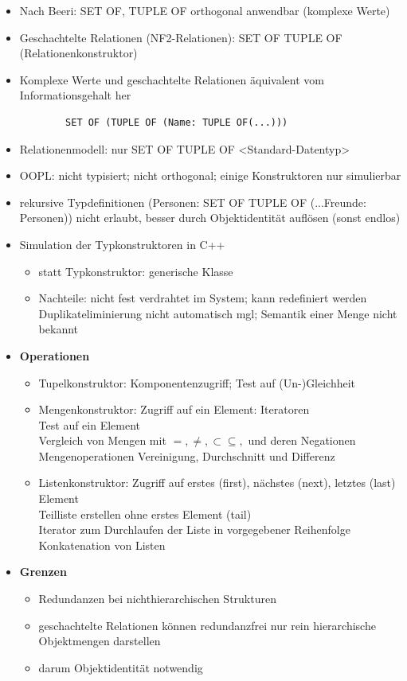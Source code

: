 \begin{itemize}
	\item Nach Beeri: SET OF, TUPLE OF orthogonal anwendbar (komplexe Werte)
	\item Geschachtelte Relationen (NF2-Relationen): SET OF TUPLE OF (Relationenkonstruktor)
	\item Komplexe Werte und geschachtelte Relationen äquivalent vom Informationsgehalt her
	\begin{lstlisting}
		SET OF (TUPLE OF (Name: TUPLE OF(...)))
	\end{lstlisting}
	\item Relationenmodell: nur SET OF TUPLE OF <Standard-Datentyp>
	\item OOPL: nicht typisiert; nicht orthogonal; einige Konstruktoren nur simulierbar
	\item rekursive Typdefinitionen (Personen: SET OF TUPLE OF (...Freunde: Personen)) nicht erlaubt, besser durch Objektidentität auflösen (sonst endlos)
	\item Simulation der Typkonstruktoren in C++
	\begin{itemize}
		\item statt Typkonstruktor: generische Klasse
		\item Nachteile: nicht fest verdrahtet im System; kann redefiniert werden\\
		Duplikateliminierung nicht automatisch mgl; Semantik einer Menge nicht bekannt
	\end{itemize}
	\item \textbf{Operationen}
	\begin{itemize}
		\item Tupelkonstruktor: Komponentenzugriff; Test auf (Un-)Gleichheit 
		\item Mengenkonstruktor: Zugriff auf ein Element: Iteratoren\\
		Test auf ein Element\\
		Vergleich von Mengen mit $=, \neq, \subset \subseteq,$ und deren Negationen\\
		Mengenoperationen Vereinigung, Durchschnitt und Differenz
		\item Listenkonstruktor: Zugriff auf erstes (first), nächstes (next), letztes (last) Element\\
		Teilliste erstellen ohne erstes Element (tail)\\
		Iterator zum Durchlaufen der Liste in vorgegebener Reihenfolge\\
		Konkatenation von Listen
	\end{itemize}
	
	\item \textbf{Grenzen}
	\begin{itemize}
		\item Redundanzen bei nichthierarchischen Strukturen
		\item geschachtelte Relationen können redundanzfrei nur rein hierarchische Objektmengen darstellen
		\item darum Objektidentität notwendig
	\end{itemize}
\end{itemize}

